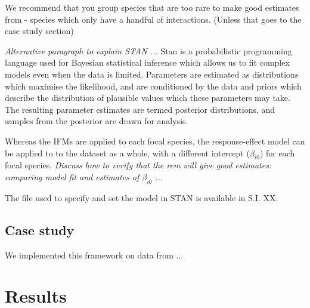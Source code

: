 \documentclass[a4,12pt]{article}
\begin{document}
        We recommend that you group species that are too rare to make good estimates from - species which only have a handful of interactions. (Unless that goes to the case study section)
    
        \textit{Alternative paragraph to explain STAN ...}
        Stan is a probabilistic programming language used for Bayesian statistical inference which allows us to fit complex models even when the data is limited. Parameters are estimated as distributions which maximise the likelihood, and are conditioned by the data and priors which describe the distribution of plausible values which these parameters may take. The resulting parameter estimates are termed posterior distributions, and samples from the posterior are drawn for analysis.
        
        Whereas the IFMs are applied to each focal species, the response-effect model can be applied to to the dataset as a whole, with a different intercept ($\beta_{i0}$) for each focal species. \textit{Discuss how to verify that the rem will give good estimates: comparing model fit and estimates of $\beta_{i0}$ ...}

        The file used to specify and set the model in STAN is available in S.I. XX. 
    
    \subsection{Case study}

        We implemented this framework on data from ...
        

\section{Results}
\end{document}
